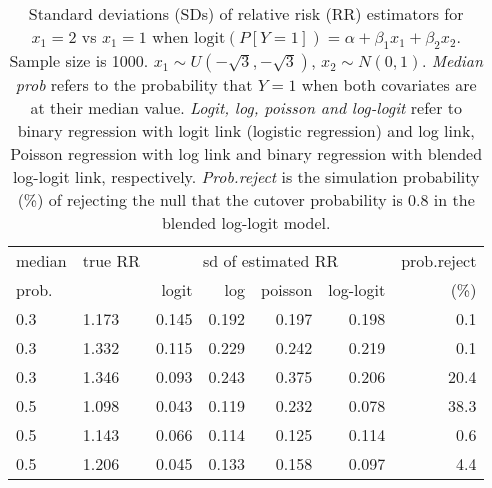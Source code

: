 \documentclass[12pt,a4paper]{article}
\begin{document}
\begin{table}[H] 
\small\sf\centering 
\caption{Standard deviations (SDs) of relative risk (RR) estimators for $x_1=2$ vs $x_1=1$ when $\mbox{logit}(P[Y=1])=\alpha+\beta_1 x_1 + \beta_2 x_2$. Sample size is 1000. $x_1 \sim $$U(-\sqrt{3},-\sqrt{3})$, $x_2 \sim N(0,1)$. {\it Median prob} refers to the probability that $Y=1$ when both covariates are at their median value. {\it Logit, log, poisson and log-logit} refer to binary regression with logit link (logistic regression) and log link, Poisson regression with log link and binary regression with blended log-logit link, respectively. {\it Prob.reject} is the simulation probability (\%) of rejecting the null that the cutover probability is $0.8$ in the blended log-logit model.} 
\begin{tabular}{llrrrrr} 
\toprule 
median & true RR & \multicolumn{4}{c}{sd of estimated RR} & prob.reject \\ 
prob. & & logit & log & poisson & log-logit  & (\%) \\ \midrule 
0.3 & 1.173 & 0.145 & 0.192 & 0.197 & 0.198 &  0.1 \\  
0.3 & 1.332 & 0.115 & 0.229 & 0.242 & 0.219 &  0.1 \\  
0.3 & 1.346 & 0.093 & 0.243 & 0.375 & 0.206 & 20.4 \\  
0.5 & 1.098 & 0.043 & 0.119 & 0.232 & 0.078 & 38.3 \\  
0.5 & 1.143 & 0.066 & 0.114 & 0.125 & 0.114 &  0.6 \\  
0.5 & 1.206 & 0.045 & 0.133 & 0.158 & 0.097 &  4.4 \\  
\bottomrule 
\end{tabular} 
\end{table} 
\end{document}
